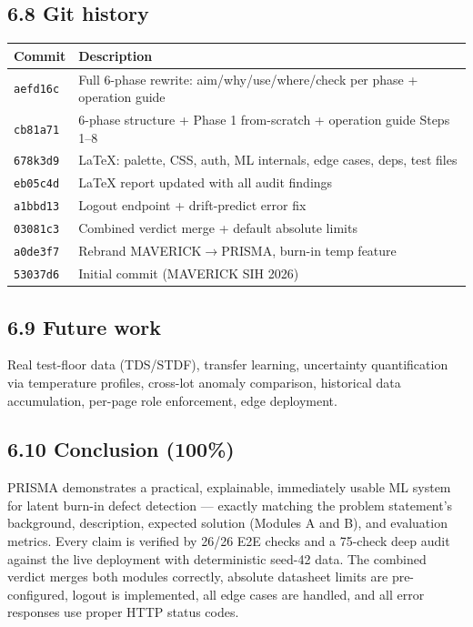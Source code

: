 \documentclass[11pt,a4paper]{article}
\newcommand{\code}[1]{\texttt{\small #1}}
\begin{document}
\subsection*{6.8 Git history}
\begin{center}
\begin{tabular}{@{}ll@{}}
\toprule
\textbf{Commit} & \textbf{Description}\\
\midrule
\code{aefd16c} & Full 6-phase rewrite: aim/why/use/where/check per phase + operation guide\\
\code{cb81a71} & 6-phase structure + Phase 1 from-scratch + operation guide Steps 1--8\\
\code{678k3d9} & LaTeX: palette, CSS, auth, ML internals, edge cases, deps, test files\\
\code{eb05c4d} & LaTeX report updated with all audit findings\\
\code{a1bbd13} & Logout endpoint + drift-predict error fix\\
\code{03081c3} & Combined verdict merge + default absolute limits\\
\code{a0de3f7} & Rebrand MAVERICK$\rightarrow$PRISMA, burn-in temp feature\\
\code{53037d6} & Initial commit (MAVERICK SIH 2026)\\
\bottomrule
\end{tabular}
\end{center}

\subsection*{6.9 Future work}
Real test-floor data (TDS/STDF), transfer learning, uncertainty quantification via temperature
profiles, cross-lot anomaly comparison, historical data accumulation, per-page role enforcement,
edge deployment.

\subsection*{6.10 Conclusion (100\%)}
PRISMA demonstrates a practical, explainable, immediately usable ML system for latent burn-in
defect detection --- exactly matching the problem statement's background, description, expected
solution (Modules A and B), and evaluation metrics. Every claim is verified by 26/26 E2E checks
and a 75-check deep audit against the live deployment with deterministic seed-42 data. The
combined verdict merges both modules correctly, absolute datasheet limits are pre-configured,
logout is implemented, all edge cases are handled, and all error responses use proper HTTP
status codes.
\end{document}

